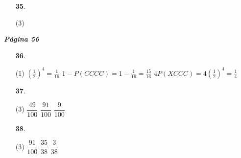 \documentclass[a4paper, pdf, twoside]{book}
\begin{document}
\begin{multicols}{2}
\begin{enumerate}

 \item[\fontfamily{phv}\selectfont\color{blue}\textbf{35}. ]  \scalebox{0.6}{\simbolclau } 
 \begin{tasks}[column-sep=1em, item-indent=1.3333em](3)
\end{tasks}
 \end{enumerate}
\vspace{0.3cm}


{\textbf{\em Pàgina 56}} \hrulefill
\begin{enumerate}
\vspace{0.25cm}



 \item[\fontfamily{phv}\selectfont\color{blue}\textbf{36}. ] 
 \begin{tasks}[column-sep=1em, item-indent=1.3333em](1)
	 \task* $\left (\frac {1}{2}\right )^4= \frac {1}{16}$
	 \task* $1-P(CCCC)=1-\frac {1}{16}=\frac {15}{16}$
	 \task* $4 P(XCCC)=4\left (\frac {1}{2}\right )^4=\frac {1}{4}$
\end{tasks}
 \end{enumerate}
\begin{enumerate}
\vspace{0.25cm}



 \item[\fontfamily{phv}\selectfont\color{blue}\textbf{37}. ]  \scalebox{0.6}{\simbolclau } 
 \begin{tasks}[column-sep=1em, item-indent=1.3333em](3)
	 \task $\dfrac {49}{100}$
	 \task $\dfrac {91}{100}$
	 \task $\dfrac {9}{100}$
\end{tasks}
\vspace{0.25cm}



 \item[\fontfamily{phv}\selectfont\color{blue}\textbf{38}. ]  \scalebox{0.6}{\simbolclau } 
 \begin{tasks}[column-sep=1em, item-indent=1.3333em](3)
	 \task $\dfrac {91}{100}$
	 \task $\dfrac {35}{38}$
	 \task $\dfrac {3}{38}$
\end{tasks}
\vspace{0.25cm}



\end{enumerate}
\end{multicols}
\end{document}
